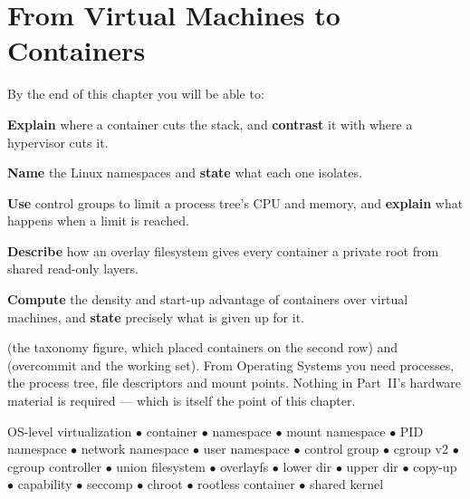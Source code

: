 \chapter{From Virtual Machines to Containers}\label{ch:containers}

\begin{outcomes}
By the end of this chapter you will be able to:
\begin{tight}
  \item \textbf{Explain} where a container cuts the stack, and \textbf{contrast}
        it with where a hypervisor cuts it.
  \item \textbf{Name} the Linux namespaces and \textbf{state} what each one
        isolates.
  \item \textbf{Use} control groups to limit a process tree's CPU and memory,
        and \textbf{explain} what happens when a limit is reached.
  \item \textbf{Describe} how an overlay filesystem gives every container a
        private root from shared read-only layers.
  \item \textbf{Compute} the density and start-up advantage of containers over
        virtual machines, and \textbf{state} precisely what is given up for it.
\end{tight}
\end{outcomes}

\begin{prereq}
 (the taxonomy figure, which placed containers on the
second row) and  (overcommit and the working set). From Operating
Systems you need processes, the process tree, file descriptors and mount
points. Nothing in Part~II's hardware material is required --- which is itself
the point of this chapter.
\end{prereq}

\begin{keyterms}
OS-level virtualization $\bullet$ container $\bullet$ namespace $\bullet$ mount
namespace $\bullet$ PID namespace $\bullet$ network namespace $\bullet$ user
namespace $\bullet$ control group $\bullet$ cgroup v2 $\bullet$ cgroup
controller $\bullet$ union filesystem $\bullet$ overlayfs $\bullet$ lower dir
$\bullet$ upper dir $\bullet$ copy-up $\bullet$ capability $\bullet$ seccomp
$\bullet$ chroot $\bullet$ rootless container $\bullet$ shared kernel
\end{keyterms}

